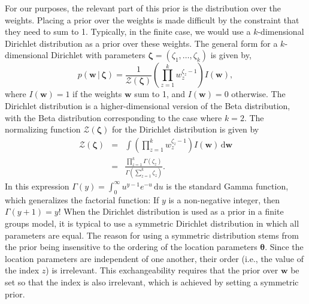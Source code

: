\documentclass[authoryear]{elsarticle}
\newcommand{\condon}{\,|\,}
\newcommand{\vctr}[1]{\bm{#1}}
\newcommand{\dnorm}{\mathcal{Z}}
\begin{document}
For our purposes, the relevant part of this prior is the distribution over the
weights. Placing a prior over the weights is made difficult by the constraint
that they need to sum to 1. Typically, in the finite case, we would use a
$k$-dimensional Dirichlet distribution as a prior over these weights. The
general form for a $k$-dimensional Dirichlet with parameters
$\vctr{\zeta}=(\zeta_1,\ldots,\zeta_k)$ is given by,
\begin{equation}
        p(\vctr{w}\condon \vctr{\zeta}) = \frac{1}{\dnorm(\vctr{\zeta})}
        \left( \prod_{z=1}^{k} w_z^{\zeta_z-1}\right) I(\vctr{w}),
\end{equation}
where $I(\vctr{w})=1$ if the weights $\vctr{w}$ sum to 1, and
$I(\vctr{w})=0$ otherwise. The Dirichlet distribution is a higher-dimensional
version of the Beta distribution, with the Beta distribution corresponding to
the case where $k=2$.
The normalizing function $\dnorm(\vctr{\zeta})$
for the Dirichlet distribution is given by
\begin{eqnarray}
        \label{dirnorm}
        \dnorm(\vctr{\zeta}) &=& \int  \left( \prod_{z=1}^{k} w_z^{\zeta_z-1} \right)
        I(\vctr{w}) \, \mathrm{d}\vctr{w} \nonumber \\
        &=&\frac{\prod_{z=1}^k \Gamma \left(\zeta_z \right)}
        {\Gamma \left(\sum_{z=1}^k \zeta_z\right)}.
\end{eqnarray}
In this expression $\Gamma(y)=\int_0^\infty u^{y-1}e^{-u} \, \mathrm{d}u$ is the
standard Gamma function, which generalizes the factorial function: If $y$ is
a non-negative integer, then $\Gamma(y+1)=y!$ When the Dirichlet distribution is used
as a prior in a finite groups model, it is typical to use a symmetric Dirichlet distribution
in which all parameters are equal. The reason for using a symmetric
distribution stems from the prior being insensitive to the ordering of the location
parameters $\vctr{\theta}$. Since the location parameters are
independent of one another, their order (i.e., the value of the index $z$) is irrelevant.
This exchangeability requires that the prior over $\vctr{w}$ be set
so that the index is also irrelevant, which is achieved by setting a
symmetric prior.
\end{document}
